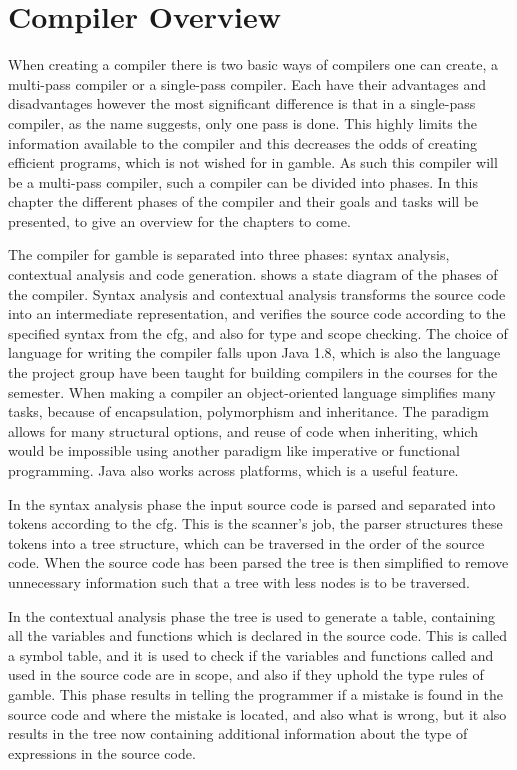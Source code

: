 \chapter{Compiler Overview}\label{Chp:CompilerOverview}
When creating a compiler there is two basic ways of compilers one can create, a multi-pass compiler or a single-pass compiler.
Each have their advantages and disadvantages however the most significant difference is that in a single-pass compiler, as the name suggests, only one pass is done.
This highly limits the information available to the compiler and this decreases the odds of creating efficient programs, which is not wished for in \gls{gamble}.
As such this compiler will be a multi-pass compiler, such a compiler can be divided into phases.
In this chapter the different phases of the compiler and their goals and tasks will be presented, to give an overview for the chapters to come.

The compiler for \gls{gamble} is separated into three phases: syntax analysis, contextual analysis and code generation.
 shows a state diagram of the phases of the compiler.
Syntax analysis and contextual analysis transforms the source code into an intermediate representation, and verifies the source code according to the specified syntax from the \acrshort{cfg}, and also for type and scope checking.
The choice of language for writing the compiler falls upon Java 1.8, which is also the language the project group have been taught for building compilers in the courses for the semester.
When making a compiler an object-oriented language simplifies many tasks, because of encapsulation, polymorphism and inheritance. 
The paradigm allows for many structural options, and reuse of code when inheriting, which would be impossible using another paradigm like imperative or functional programming.
Java also works across platforms, which is a useful feature.

In the syntax analysis phase the input source code is parsed and separated into tokens according to the \acrshort{cfg}.
This is the scanner's job, the parser structures these tokens into a tree structure, which can be traversed in the order of the source code.
When the source code has been parsed the tree is then simplified to remove unnecessary information such that a tree with less nodes is to be traversed.

In the contextual analysis phase the tree is used to generate a table, containing all the variables and functions which is declared in the source code.
This is called a symbol table, and it is used to check if the variables and functions called and used in the source code are in scope, and also if they uphold the type rules of \gls{gamble}.
This phase results in telling the programmer if a mistake is found in the source code and where the mistake is located, and also what is wrong, but it also results in the tree now containing additional information about the type of expressions in the source code.

